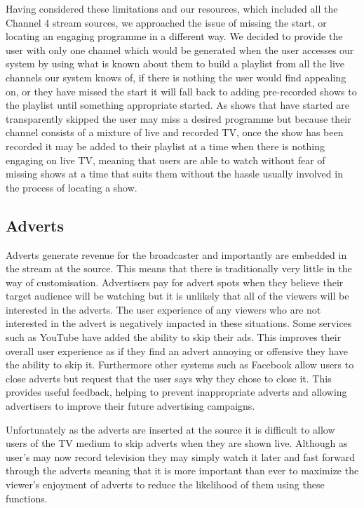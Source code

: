 Having considered these limitations and our resources, which included all the Channel 4 stream sources, we approached the issue of missing the start, or locating an engaging programme in a different way. We decided to provide the user with only one channel which would be generated when the user accesses our system by using what is known about them to build a playlist from all the live channels our system knows of, if there is nothing the user would find appealing on, or they have missed the start it will fall back to adding pre-recorded shows to the playlist until something appropriate started. As shows that have started are transparently skipped the user may miss a desired programme but because their channel consists of a mixture of live and recorded TV, once the show has been recorded it may be added to their playlist at a time when there is nothing engaging on live TV, meaning that users are able to watch without fear of missing shows at a time that suits them without the hassle usually involved in the process of locating a show.

\subsection{Adverts}
Adverts generate revenue for the broadcaster and importantly are embedded in the stream at the source. This means that there is traditionally very little in the way of customisation. Advertisers pay for advert spots when they believe their target audience will be watching but it is unlikely that all of the viewers will be interested in the adverts. The user experience of any viewers who are not interested in the advert is negatively impacted in these situations. Some services such as YouTube have added the ability to skip their ads. This improves their overall user experience as if they find an advert annoying or offensive they have the ability to skip it. Furthermore other systems such as Facebook allow users to close adverts but request that the user says why they chose to close it. This provides useful feedback, helping to prevent inappropriate adverts and allowing advertisers to improve their future advertising campaigns.

Unfortunately as the adverts are inserted at the source it is difficult to allow users of the TV medium to skip adverts when they are shown live. Although as user's may now record television they may simply watch it later and fast forward through the adverts meaning that it is more important than ever to maximize the viewer's enjoyment of adverts to reduce the likelihood of them using these functions.

